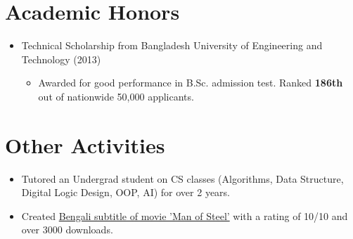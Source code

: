 \documentclass[letterpaper,10pt]{article}
\begin{document}
\section{Academic Honors}
\begin{itemize}
    \item 
    Technical Scholarship from Bangladesh University of Engineering and Technology (2013)
    \begin{itemize}
        \item Awarded for good performance in B.Sc. admission test. Ranked \textbf{186th} out of nationwide 50,000 applicants.
    \end{itemize}
\end{itemize}

\section{Other Activities}
\begin{itemize}
    \item Tutored an Undergrad student on CS classes (Algorithms, Data Structure, Digital Logic Design, OOP, AI) for over 2 years.
    
    \item Created \href{https://subscene.com/subtitles/man-of-steel/bengali/805207}{Bengali subtitle of movie 'Man of Steel'} with a rating of 10/10 and over 3000 downloads.
\end{itemize}


\begin{comment}
\section{Research Experience}
\begin{itemize}
    \item \textbf{\textsc{Topic-Relevant Fragment Extraction From Video Tutorials}} \\
    Supervisor : Dr. Anindya Iqbal, Bangladesh University of Engineering and Technology \\
    Focus : Software Engineering, Information retrieval \\
    Summary : The target was to identify the interval when a certain topic was discussed in a very lengthy video. OCR, Speech-to-text were used to identify those intervals. To increase the efficiency of OCR 'Weighted Levenshtein distance' was used. The application was successfully tested with 985 min long \textsc{Youtube} videos.
\end{itemize}

\end{comment}
\end{document}
